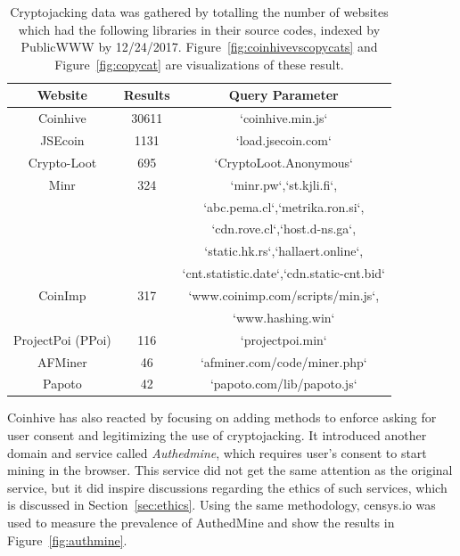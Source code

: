 \begin{table}[h]
\centering
\begin{tabular}{|cc|c|}
\hline
\textbf{Website} & \textbf{Results} & \textbf{Query Parameter}  \\ \hline
Coinhive & 30611 & `coinhive.min.js`   \\  \hline
JSEcoin & 1131 & `load.jsecoin.com`   \\  \hline
Crypto-Loot & 695 & `CryptoLoot.Anonymous`  \\  \hline
Minr & 324 & `minr.pw`,`st.kjli.fi`, \\
~  & ~ &  `abc.pema.cl`,`metrika.ron.si`, \\  
~  & ~ &  `cdn.rove.cl`,`host.d-ns.ga`, \\  
~  & ~ &  `static.hk.rs`,`hallaert.online`, \\  
~  & ~ &  `cnt.statistic.date`,`cdn.static-cnt.bid` \\     \hline
CoinImp & 317 &`www.coinimp.com/scripts/min.js`,  \\ 
~  & ~ &  `www.hashing.win` \\     \hline
ProjectPoi (PPoi) & 116 & `projectpoi.min`  \\  \hline
AFMiner & 46 & `afminer.com/code/miner.php`	  \\  \hline
Papoto & 42 & `papoto.com/lib/papoto.js`  \\ \hline
\end{tabular}
\bigskip
\caption{Cryptojacking data was gathered by totalling the number of websites which had the following libraries in their source codes, indexed by PublicWWW by 12/24/2017. Figure~\ref{fig:coinhivevscopycats} and Figure~\ref{fig:copycat} are visualizations of these result.\label{tab:findcoinhive}}
\end{table}



Coinhive has also reacted by focusing on adding methods to enforce asking for user consent and legitimizing the use of cryptojacking. It introduced another domain and service called \textit{Authedmine}, which requires user's consent to start mining in the browser. This service did not get the same attention as the original service, but it did inspire discussions regarding the ethics of such services, which is discussed in Section~\ref{sec:ethics}. Using the same methodology, censys.io was used to measure the prevalence of AuthedMine and show the results in Figure~\ref{fig:authmine}. 

